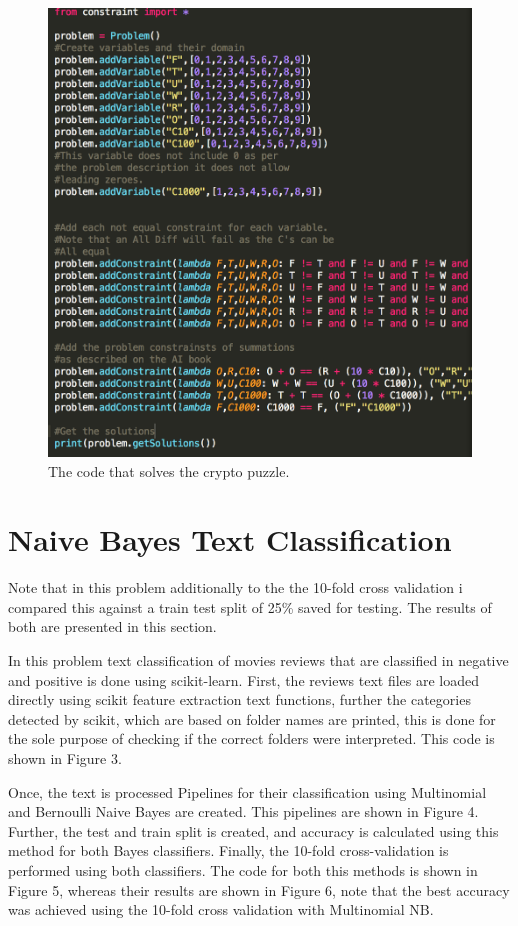 \documentclass[12pt, letter]{article}
\begin{document}
 \begin{figure}[htb]
  \centering
  \includegraphics[width=0.80 \textwidth]{./figures/csp_code.png}
  \caption{The code that solves the crypto puzzle.}
\end{figure}

\FloatBarrier

\section{Naive Bayes Text Classification}

Note that in this problem additionally to the  the 10-fold cross validation i compared this against a train test split of 25\% saved for testing. The results of both are presented in this section. 

In this problem text classification of movies reviews that are classified in negative and positive is done using scikit-learn. First, the reviews text files are loaded directly using scikit feature extraction text functions, further the categories detected by scikit, which are based on folder names are printed, this is done for the sole purpose of checking if the correct folders were interpreted. This code is shown in Figure 3.

Once, the text is processed Pipelines for their classification using Multinomial and Bernoulli Naive Bayes are created. This pipelines are shown in Figure 4. Further, the test and train split is created, and accuracy is calculated using this method for both Bayes classifiers. Finally, the 10-fold cross-validation is performed using both classifiers. The code for both this methods is shown in Figure 5, whereas their results are shown in Figure 6, note that the best accuracy was achieved using the 10-fold cross validation with Multinomial NB. 
\end{document}

